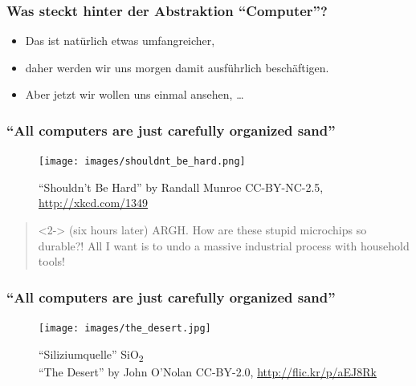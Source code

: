 \begin{frame}
	\frametitle{Was steckt hinter der Abstraktion ``Computer''?}

	\begin{itemize}
		\item Das ist natürlich etwas umfangreicher,
		\item daher werden wir uns morgen damit ausführlich beschäftigen.
		\item Aber jetzt wir wollen uns einmal ansehen, \ldots
	\end{itemize}

\end{frame}



\begin{frame}
	\frametitle{``All computers are just carefully organized sand''}
	\begin{figure}
		\centering
		\texttt{[image: images/shouldnt\_be\_hard.png]}
		\caption{``Shouldn't Be Hard'' by Randall Munroe
		CC-BY-NC-2.5, \url{http://xkcd.com/1349}}
	\end{figure}

	\begin{quote}<2->
		(six hours later) ARGH. How are these stupid microchips so durable?!
		All I want is to undo a massive industrial process with household
		tools!
	\end{quote}
\end{frame}

\begin{frame}
	\frametitle{``All computers are just carefully organized sand''}

	\begin{figure}
		\centering
		\texttt{[image: images/the\_desert.jpg]}
		\caption{``Siliziumquelle'' SiO\textsubscript{2} \\
		``The Desert'' by John O'Nolan
		CC-BY-2.0, \url{http://flic.kr/p/aEJ8Rk}}
	\end{figure}
\end{frame}

